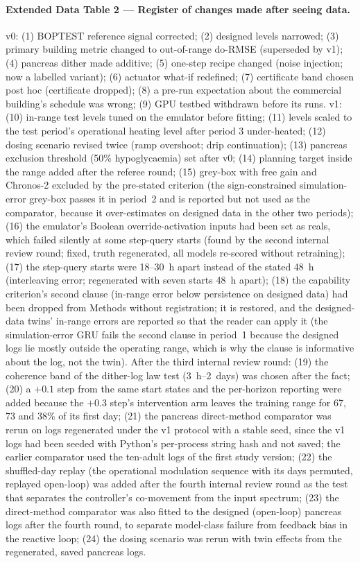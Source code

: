 \documentclass[11pt]{article}
\begin{document}
\paragraph{Extended Data Table 2 --- Register of changes made after seeing data.} v0: (1) BOPTEST reference signal corrected; (2) designed levels narrowed; (3) primary building metric changed to out-of-range do-RMSE (superseded by v1); (4) pancreas dither made additive; (5) one-step recipe changed (noise injection; now a labelled variant); (6) actuator what-if redefined; (7) certificate band chosen post hoc (certificate dropped); (8) a pre-run expectation about the commercial building's schedule was wrong; (9) GPU testbed withdrawn before its runs. v1: (10) in-range test levels tuned on the emulator before fitting; (11) levels scaled to the test period's operational heating level after period 3 under-heated; (12) dosing scenario revised twice (ramp overshoot; drip continuation); (13) pancreas exclusion threshold (50\% hypoglycaemia) set after v0; (14) planning target inside the range added after the referee round; (15) grey-box with free gain and Chronos-2 excluded by the pre-stated criterion (the sign-constrained simulation-error grey-box passes it in period~2 and is reported but not used as the comparator, because it over-estimates on designed data in the other two periods); (16) the emulator's Boolean override-activation inputs had been set as reals, which failed silently at some step-query starts (found by the second internal review round; fixed, truth regenerated, all models re-scored without retraining); (17) the step-query starts were 18--30~h apart instead of the stated 48~h (interleaving error; regenerated with seven starts 48~h apart); (18) the capability criterion's second clause (in-range error below persistence on designed data) had been dropped from Methods without registration; it is restored, and the designed-data twins' in-range errors are reported so that the reader can apply it (the simulation-error GRU fails the second clause in period~1 because the designed logs lie mostly outside the operating range, which is why the clause is informative about the log, not the twin). After the third internal review round: (19) the coherence band of the dither-log law test (3~h--2~days) was chosen after the fact; (20) a $+0.1$ step from the same start states and the per-horizon reporting were added because the $+0.3$ step's intervention arm leaves the training range for 67, 73 and 38\% of its first day; (21) the pancreas direct-method comparator was rerun on logs regenerated under the v1 protocol with a stable seed, since the v1 logs had been seeded with Python's per-process string hash and not saved; the earlier comparator used the ten-adult logs of the first study version; (22) the shuffled-day replay (the operational modulation sequence with its days permuted, replayed open-loop) was added after the fourth internal review round as the test that separates the controller's co-movement from the input spectrum; (23) the direct-method comparator was also fitted to the designed (open-loop) pancreas logs after the fourth round, to separate model-class failure from feedback bias in the reactive loop; (24) the dosing scenario was rerun with twin effects from the regenerated, saved pancreas logs.
\end{document}
